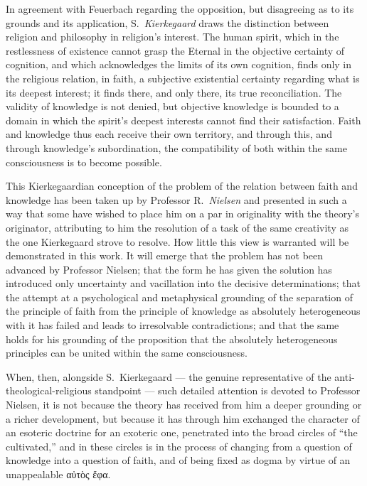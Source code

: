 \documentclass[12pt,a4paper]{book}
\begin{document}
In agreement with Feuerbach regarding the opposition, but disagreeing
as to its grounds and its application, S.\ \emph{Kierkegaard} draws the
distinction between religion and philosophy in religion's interest.
The human spirit, which in the restlessness of existence cannot grasp
the Eternal in the objective certainty of cognition, and which
acknowledges the limits of its own cognition, finds only in the
religious relation, in faith, a subjective existential certainty
regarding what is its deepest interest; it finds there, and only
there, its true reconciliation. The validity of knowledge is not
denied, but objective knowledge is bounded to a domain in which the
spirit's deepest interests cannot find their satisfaction. Faith and
knowledge thus each receive their own territory, and through this, and
through knowledge's subordination, the compatibility of both within
the same consciousness is to become possible.

This Kierkegaardian conception of the problem of the relation between
faith and knowledge has been taken up by Professor R.\ \emph{Nielsen} and
presented in such a way that some have wished to place him on a par in
originality with the theory's originator, attributing to him the
resolution of a task of the same creativity as the one Kierkegaard
strove to resolve. How little this view is warranted will be
demonstrated in this work. It will emerge that the problem has not
been advanced by Professor Nielsen; that the form he has given the
solution has introduced only uncertainty and vacillation into the
decisive determinations; that the attempt at a psychological and
metaphysical grounding of the separation of the principle of faith
from the principle of knowledge as absolutely heterogeneous with it
has failed and leads to irresolvable contradictions; and that the same
holds for his grounding of the proposition that the absolutely
heterogeneous principles can be united within the same consciousness.

When, then, alongside S.\ Kierkegaard --- the genuine representative
of the anti-theological-religious standpoint --- such detailed
attention is devoted to Professor Nielsen, it is not because the
theory has received from him a deeper grounding or a richer
development, but because it has through him exchanged the character of
an esoteric doctrine for an exoteric one, penetrated into the broad
circles of ``the cultivated,'' and in these circles is in the process
of changing from a question of knowledge into a question of faith, and
of being fixed as dogma by virtue of an unappealable
αὐτὸς ἔφα.
\end{document}
